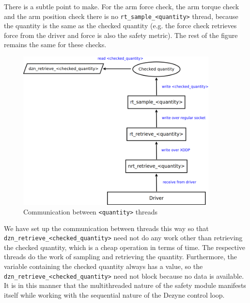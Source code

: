 \documentclass[12pt]{scrreprt}
\begin{document}
\par
There is a subtle point to make. For the arm force check, the arm torque check and the arm position check there is no \texttt{rt\_sample\_<quantity>} thread, because the quantity is the same as the checked quantity (e.g. the force check retrieves force from the driver and force is also the safety metric). The rest of the figure remains the same for these checks.

\begin{figure}[H]
    \centering
    \includegraphics[width=0.9\textwidth]{Figures/results/modelling_figures/Threading/quantity_threads.png}
    \caption{Communication between \texttt{<quantity>} threads}
    \label{fig:quantity_threads}
\end{figure}

We have set up the communication between threads this way so that\\ \texttt{dzn\_retrieve\_<checked\_quantity>} need not do any work other than retrieving the checked quantity, which is a cheap operation in terms of time. The respective threads do the work of sampling and retrieving the quantity. Furthermore, the variable containing the checked quantity always has a value, so the \texttt{dzn\_retrieve\_<checked\_quantity>} need not block because no data is available. It is in this manner that the multithreaded nature of the safety module manifests itself while working with the sequential nature of the Dezyne control loop.


\end{document}
